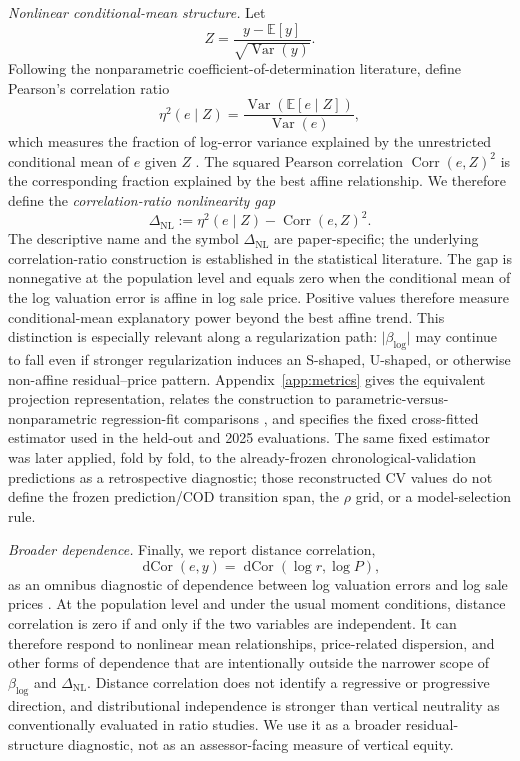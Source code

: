 \documentclass[10pt]{article}
\theoremstyle{definition}
\newcommand{\E}{\mathbb{E}}
\newcommand{\Corr}{\operatorname{Corr}}
\newcommand{\Var}{\operatorname{Var}}
\newcommand{\1}{\mathbf{1}}
\newcommand{\latesttext}[1]{\textcolor{latestPurple}{#1}}
\begin{document}
{\emph{Nonlinear conditional-mean structure.}
Let
\[
Z=\frac{y-\E[y]}{\sqrt{\Var(y)}}.
\]
Following the nonparametric coefficient-of-determination literature, define Pearson's
correlation ratio
\[
\eta^2(e\mid Z)
=
\frac{\Var\!\left(\E[e\mid Z]\right)}{\Var(e)},
\]
which measures the fraction of log-error variance explained by the unrestricted
conditional mean of $e$ given $Z$ \cite{DoksumSamarov1995}. The squared Pearson
correlation $\Corr(e,Z)^2$ is the corresponding fraction explained by the best
affine relationship. We therefore define the \emph{correlation-ratio nonlinearity
gap}
\begin{equation}
\label{eq:nonlinearity_gap}
\Delta_{\mathrm{NL}}
:=
\eta^2(e\mid Z)-\Corr(e,Z)^2.
\end{equation}
The descriptive name and the symbol $\Delta_{\mathrm{NL}}$ are paper-specific;
the underlying correlation-ratio construction is established in the statistical
literature. The gap is nonnegative at the population level and equals zero when the
conditional mean of the log valuation error is affine in log sale price. Positive
values therefore measure conditional-mean explanatory power beyond the best affine
trend. This distinction is especially relevant along a regularization path:
$\lvert\beta_{\log}\rvert$ may continue to fall even if stronger regularization
induces an S-shaped, U-shaped, or otherwise non-affine residual--price pattern.
Appendix~\ref{app:metrics} gives the equivalent projection representation, relates
the construction to parametric-versus-nonparametric regression-fit comparisons
\cite{HardleMammen1993}, and specifies the fixed cross-fitted estimator used in the
held-out and 2025 evaluations.
\latesttext{The same fixed estimator was later applied, fold by fold, to the already-frozen chronological-validation predictions as a retrospective diagnostic; those reconstructed CV values do not define the frozen prediction/COD transition span, the $\rho$ grid, or a model-selection rule.}

\emph{Broader dependence.}
Finally, we report distance correlation,
\begin{equation}
\label{eq:dcor_diagnostic}
\operatorname{dCor}(e,y)
=
\operatorname{dCor}(\log r,\log P),
\end{equation}
as an omnibus diagnostic of dependence between log valuation errors and log sale
prices \cite{SzekelyRizzoBakirov2007}. At the population level and under the usual
moment conditions, distance correlation is zero if and only if the two variables
are independent. It can therefore respond to nonlinear mean relationships,
price-related dispersion, and other forms of dependence that are intentionally
outside the narrower scope of $\beta_{\log}$ and $\Delta_{\mathrm{NL}}$. Distance
correlation does not identify a regressive or progressive direction, and
distributional independence is stronger than vertical neutrality as conventionally
evaluated in ratio studies. We use it as a broader residual-structure diagnostic,
not as an assessor-facing measure of vertical equity.
}
\end{document}
